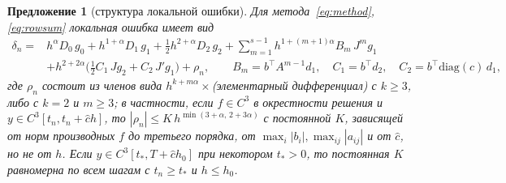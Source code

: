 \documentclass[11pt,a4paper]{article}
\theoremstyle{plain}
\newtheorem{proposition}{Предложение}
\theoremstyle{definition}
\begin{document}
\begin{proposition}[структура локальной ошибки]\label{prop:structure}
Для метода~\eqref{eq:method}, \eqref{eq:rowsum} локальная ошибка имеет вид
\begin{align*}
\delta_n={}&h^{\alpha}D_0\,g_0+h^{1+\alpha}D_1\,g_1+\tfrac12h^{2+\alpha}D_2\,g_2
+\sum_{m=1}^{s-1}h^{1+(m+1)\alpha}B_m\,J^{m}g_1\\
&+h^{2+2\alpha}\bigl(\tfrac12C_1\,Jg_2+C_2\,J'g_1\bigr)+\rho_n,
\qquad B_m=b^{\top}A^{m-1}d_1,\quad C_1=b^{\top}d_2,\quad C_2=b^{\top}\mathrm{diag}(c)\,d_1,
\end{align*}
где $\rho_n$ состоит из членов вида $h^{k+m\alpha}\times$(элементарный дифференциал) с $k\ge3$, либо с $k=2$ и $m\ge3$; в частности, если $f\in C^3$ в окрестности решения и $y\in C^3[t_n,t_n+\hat ch]$, то $|\rho_n|\le K\,h^{\min(3+\alpha,\,2+3\alpha)}$ с постоянной $K$, зависящей от норм производных $f$ до третьего порядка, от $\max_i|b_i|,\max_{ij}|a_{ij}|$ и от $\hat c$, но не от $h$. Если $y\in C^3[t_*,T+\hat ch_0]$ при некотором $t_*>0$, то постоянная $K$ равномерна по всем шагам с $t_n\ge t_*$ и $h\le h_0$.
\end{proposition}
\end{document}
